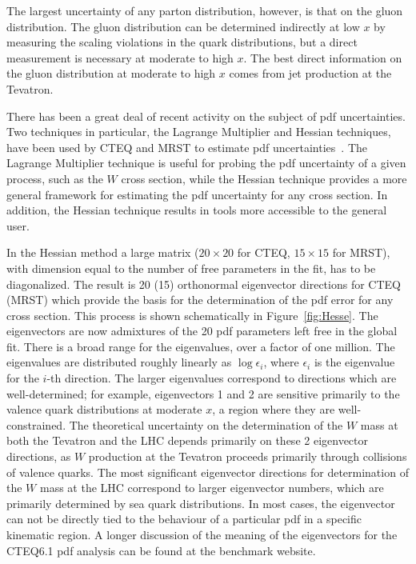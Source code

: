 \documentclass[12pt]{iopart}
\begin{document}
The largest uncertainty of any parton distribution, however, is that on the gluon distribution. The gluon distribution can be
determined indirectly at low $x$ by measuring the scaling violations in the quark distributions, but a direct measurement is
necessary at moderate to high $x$. The best direct information on the gluon distribution at moderate to high $x$ comes from jet
production at the Tevatron. 

There has been a great deal of recent activity on the subject of pdf uncertainties. Two techniques in particular, the Lagrange
Multiplier and Hessian techniques, have been used by CTEQ and MRST to estimate pdf uncertainties~\cite{Stump:2001gu,
Pumplin:2001ct, Martin:2002aw}. The Lagrange Multiplier technique is useful for probing the pdf uncertainty of a given process,
such as the $W$ cross section, while the Hessian technique provides a more general framework for estimating the pdf uncertainty for
any cross section. In addition, the Hessian technique results in tools more accessible to the general user. 

In the Hessian method a large matrix ($20\times20$ for CTEQ, $15\times15$ for MRST), with dimension equal to the number of free
parameters in the fit, has to be diagonalized. The result is 20 (15) orthonormal eigenvector directions for CTEQ (MRST) which
provide the basis for the determination of the pdf error for any cross section. This process is shown schematically in
Figure~\ref{fig:Hesse}. The eigenvectors are now admixtures of the 20 pdf parameters left free in the global fit. There is a
broad range for the eigenvalues, over a factor of one million. The  eigenvalues are distributed roughly linearly as $\log
\epsilon_i$, where $\epsilon_i$ is the eigenvalue  for the $i$-th direction. The larger eigenvalues correspond to directions which
are well-determined; for example, eigenvectors 1 and 2 are sensitive primarily to the valence quark distributions at moderate
$x$, a region where they are well-constrained. The theoretical uncertainty on the determination of the $W$ mass at both the Tevatron and the LHC
depends primarily on these 2 eigenvector directions, as $W$ production at the Tevatron proceeds primarily through collisions of
valence quarks. The most significant eigenvector directions for determination of the $W$ mass at the LHC correspond to larger
eigenvector numbers, which are primarily determined by sea quark distributions. In most cases, the eigenvector can not be
directly tied to the behaviour of a particular pdf in a specific kinematic region. A longer discussion of the meaning of the
eigenvectors for the CTEQ6.1 pdf analysis can be found at the benchmark website. 
\end{document}
